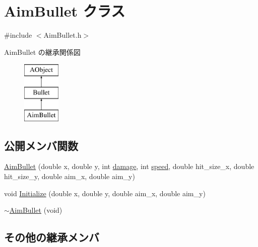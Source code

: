 \hypertarget{class_aim_bullet}{\section{Aim\+Bullet クラス}
\label{class_aim_bullet}
}


{\ttfamily \#include $<$Aim\+Bullet.\+h$>$}

Aim\+Bullet の継承関係図\begin{figure}[H]
\begin{center}
\leavevmode
\includegraphics[height=3.000000cm]{class_aim_bullet}
\end{center}
\end{figure}
\subsection*{公開メンバ関数}
\begin{DoxyCompactItemize}
\item 
\hyperlink{class_aim_bullet_a17f0f2518c17e14a45a3db64640830ac}{Aim\+Bullet} (double x, double y, int \hyperlink{class_bullet_a6e5b78574ec8fbff411b1319cf111799}{damage}, int \hyperlink{class_a_object_abb924b7e558a2f9d86f2db2bc2fb18a4}{speed}, double hit\+\_\+size\+\_\+x, double hit\+\_\+size\+\_\+y, double aim\+\_\+x, double aim\+\_\+y)
\item 
void \hyperlink{class_aim_bullet_aaf567ed7c1e05f982c443de279b27d13}{Initialize} (double x, double y, double aim\+\_\+x, double aim\+\_\+y)
\item 
\hyperlink{class_aim_bullet_a037ba3088af67ddfd5ede933fd7f68e4}{$\sim$\+Aim\+Bullet} (void)
\end{DoxyCompactItemize}
\subsection*{その他の継承メンバ}


